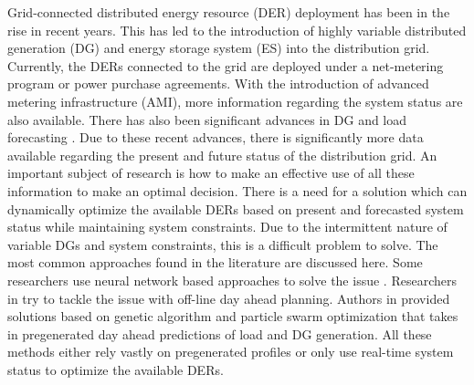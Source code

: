 Grid-connected distributed energy resource (DER) deployment has been in the rise in recent years. This has led to the introduction of highly variable distributed generation (DG) and energy storage system (ES) into the distribution grid. Currently, the DERs connected to the grid are deployed under a net-metering program or power purchase agreements. With the introduction of advanced metering infrastructure (AMI), more information regarding the system status are also available. There has also been significant advances in DG and load forecasting \cite{LOAD_FOR1,LOAD_FOR2,LOAD_FOR3,WInd_for_1,ospina2019forecasting}. Due to these recent advances, there is significantly more data available regarding the present and future status of the distribution grid. An important subject of research is how to make an effective use of all these information to make an optimal decision. There is a need for a solution which can dynamically optimize the available DERs based on present and forecasted system status while maintaining system constraints. Due to the intermittent nature of variable DGs and system constraints, this is a difficult problem to solve. The most common approaches found in the literature are discussed here. Some researchers use neural network based approaches to solve the issue \cite{OFF_LINE_1}. Researchers in \cite{off_2,off_3,off_4} try to tackle the issue with off-line day ahead planning. Authors in \cite{ANEW1,ANEW2,ANEW3} provided solutions based on genetic algorithm and particle swarm optimization that takes in pregenerated day ahead predictions of load and DG generation. All these methods either rely vastly on pregenerated profiles or only use real-time system status to optimize the available DERs. 

